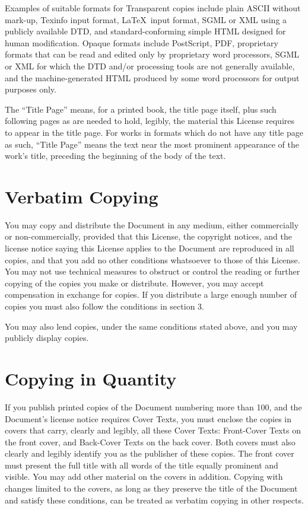     Examples of suitable formats for Transparent copies include plain
    ASCII without mark-up, Texinfo input format, \LaTeX~input format, SGML
    or XML using a publicly available DTD, and standard-conforming simple
    HTML designed for human modification.  Opaque formats include
    PostScript, PDF, proprietary formats that can be read and edited only
    by proprietary word processors, SGML or XML for which the DTD and/or
    processing tools are not generally available, and the
    machine-generated HTML produced by some word processors for output
    purposes only.

    The ``Title Page'' means, for a printed book, the title page itself,
    plus such following pages as are needed to hold, legibly, the material
    this License requires to appear in the title page.  For works in
    formats which do not have any title page as such, ``Title Page'' means
    the text near the most prominent appearance of the work's title,
    preceding the beginning of the body of the text.


    \section{Verbatim Copying}

    You may copy and distribute the Document in any medium, either
    commercially or non-commercially, provided that this License, the
    copyright notices, and the license notice saying this License applies
    to the Document are reproduced in all copies, and that you add no other
    conditions whatsoever to those of this License.  You may not use
    technical measures to obstruct or control the reading or further
    copying of the copies you make or distribute.  However, you may accept
    compensation in exchange for copies.  If you distribute a large enough
    number of copies you must also follow the conditions in section 3.

    You may also lend copies, under the same conditions stated above, and
    you may publicly display copies.


    \section{Copying in Quantity}

    If you publish printed copies of the Document numbering more than 100,
    and the Document's license notice requires Cover Texts, you must enclose
    the copies in covers that carry, clearly and legibly, all these Cover
    Texts: Front-Cover Texts on the front cover, and Back-Cover Texts on
    the back cover.  Both covers must also clearly and legibly identify
    you as the publisher of these copies.  The front cover must present
    the full title with all words of the title equally prominent and
    visible.  You may add other material on the covers in addition.
    Copying with changes limited to the covers, as long as they preserve
    the title of the Document and satisfy these conditions, can be treated
    as verbatim copying in other respects.

